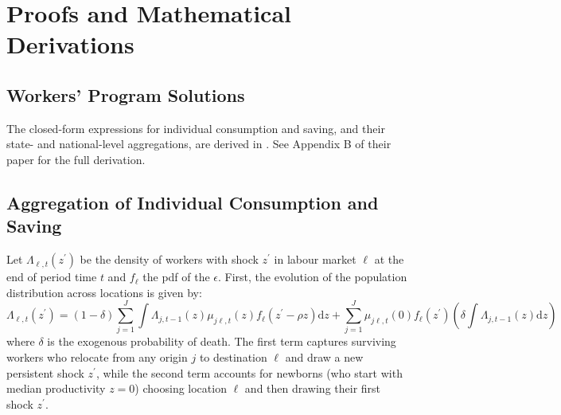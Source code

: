 \documentclass[12pt, a4paper]{article}
\begin{document}
\newpage
\appendix
{}
\section{Proofs and Mathematical Derivations}
\label{app:proofs}
\subsection{Workers' Program Solutions}
The closed-form expressions for individual consumption and saving, and their state- and national-level aggregations, are derived in \citet{dvorkin_geography_2025}. See Appendix B of their paper for the full derivation.

\subsection{Aggregation of Individual Consumption and Saving}
Let $\Lambda_{\ell, t}(z^\prime)$ be the density of workers with shock $z^\prime$ in labour market $\ell$ at the end of period time $t$ and $f_\ell$ the pdf of the $\epsilon$. First, the evolution of the population distribution across locations is given by:
\begin{equation}
\Lambda_{\ell,t}(z^\prime) = (1-\delta) \sum_{j=1}^J \int \Lambda_{j,t-1}(z) \mu_{j\ell,t}(z) f_\ell(z^\prime - \rho z) \mathrm{d}z + \sum_{j=1}^J \mu_{j\ell,t}(0) f_\ell(z^\prime) \left( \delta \int \Lambda_{j,t-1}(z) \mathrm{d}z \right)
\end{equation}
where $\delta$ is the exogenous probability of death. The first term captures surviving workers who relocate from any origin $j$ to destination $\ell$ and draw a new persistent shock $z^\prime$, while the second term accounts for newborns (who start with median productivity $z=0$) choosing location $\ell$ and then drawing their first shock $z^\prime$. 
\end{document}
